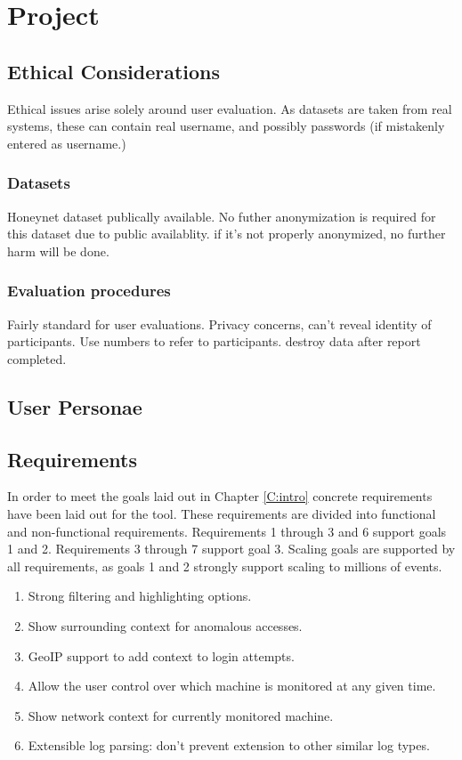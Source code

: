 \chapter{Project}\label{proj}

\section{Ethical Considerations}
Ethical issues arise solely around user evaluation.
As datasets are taken from real systems, these can contain real username, and possibly passwords (if mistakenly entered as username.)
\subsection{Datasets}
Honeynet dataset publically available. No futher anonymization is required for this dataset due to public availablity. if it's not properly anonymized, no further harm will be done. 

\subsection{Evaluation procedures}
Fairly standard for user evaluations. Privacy concerns, can't reveal identity of participants. 
Use numbers to refer to participants. destroy data after report completed. 

\section{User Personae}

\section{Requirements}\label{reqs}

In order to meet the goals laid out in Chapter \ref{C:intro} concrete requirements have been laid out for the tool.
These requirements are divided into functional and non-functional requirements. Requirements 1 through 3 and 6 support goals 1 and 2. Requirements 3 through 7 support goal 3. Scaling goals are supported by all requirements, as goals 1 and 2 strongly support scaling to millions of events.  

\begin{enumerate}
\item{Strong filtering and highlighting options.}
\item{Show surrounding context for anomalous accesses.}
\item{GeoIP support to add context to login attempts.}
\item{Allow the user control over which machine is monitored at any given time.}
\item{Show network context for currently monitored machine.}
\item{Extensible log parsing: don't prevent extension to other similar log types.}
\end{enumerate}

